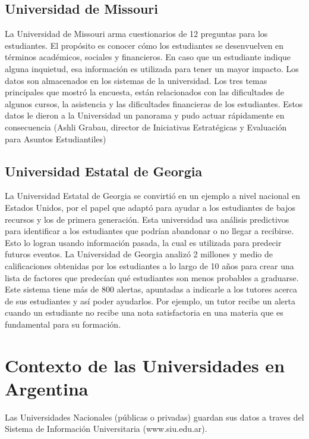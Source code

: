 \subsection[Universidad de Missouri]{Universidad de Missouri}
La Universidad de Missouri arma cuestionarios de 12 preguntas para los estudiantes. El propósito es conocer cómo los estudiantes se desenvuelven en términos académicos, sociales y financieros. En caso que un estudiante indique alguna inquietud, esa información es utilizada para tener un mayor impacto. Los datos son almacenados en los sistemas de la universidad.
Los tres temas principales que mostró la encuesta, están relacionados con las dificultades de algunos cursos, la asistencia y las dificultades financieras de los estudiantes. Estos datos le dieron a la Universidad un panorama y pudo actuar rápidamente en consecuencia (Ashli Grabau, director de Iniciativas Estratégicas y Evaluación para Asuntos Estudiantiles)

\subsection[Universidad Estatal de Georgia]{Universidad Estatal de Georgia}

La Universidad Estatal de Georgia se convirtió en un ejemplo a nivel nacional en Estados Unidos, por el papel que adaptó para ayudar a los estudiantes de bajos recursos y los de primera generación. 
Esta universidad usa análisis predictivos para identificar a los estudiantes que podrían abandonar o no llegar a recibirse. Esto lo logran usando información pasada, la cual es utilizada para predecir futuros eventos. 
La Universidad de Georgia analizó 2 millones y medio de calificaciones obtenidas por los estudiantes a lo largo de 10 años para crear una lista de factores que predecían qué estudiantes son menos probables a graduarse. Este sistema tiene más de 800 alertas, apuntadas a indicarle a los tutores acerca de sus estudiantes y así poder ayudarlos. Por ejemplo, un tutor recibe un alerta cuando un estudiante no recibe una nota satisfactoria en una materia que es fundamental para su formación. 

\section[Contexto de las Universidades en Argentina]{Contexto de las Universidades en Argentina}

Las Universidades Nacionales (públicas o privadas) guardan sus datos a traves del Sistema de Información Universitaria (www.siu.edu.ar).

